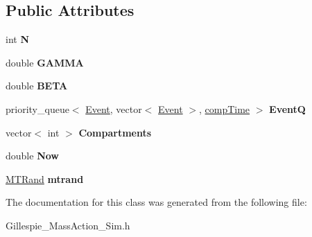 \subsection*{Public Attributes}
\begin{DoxyCompactItemize}
\item 
\hypertarget{classGillespie__MassAction__Sim_adccdc2bfebe0292d126e45dfc6483714}{}int {\bfseries N}\label{classGillespie__MassAction__Sim_adccdc2bfebe0292d126e45dfc6483714}

\item 
\hypertarget{classGillespie__MassAction__Sim_a559d55e39e19391925dca421def8671e}{}double {\bfseries G\+A\+M\+M\+A}\label{classGillespie__MassAction__Sim_a559d55e39e19391925dca421def8671e}

\item 
\hypertarget{classGillespie__MassAction__Sim_a3b757a10891e669bc4eedb85464d6198}{}double {\bfseries B\+E\+T\+A}\label{classGillespie__MassAction__Sim_a3b757a10891e669bc4eedb85464d6198}

\item 
\hypertarget{classGillespie__MassAction__Sim_abf5bebde787931664d87e0068ff58416}{}priority\+\_\+queue$<$ \hyperlink{classEvent}{Event}, vector$<$ \hyperlink{classEvent}{Event} $>$, \hyperlink{classcompTime}{comp\+Time} $>$ {\bfseries Event\+Q}\label{classGillespie__MassAction__Sim_abf5bebde787931664d87e0068ff58416}

\item 
\hypertarget{classGillespie__MassAction__Sim_ab87320968791e1161a69c11a165d677d}{}vector$<$ int $>$ {\bfseries Compartments}\label{classGillespie__MassAction__Sim_ab87320968791e1161a69c11a165d677d}

\item 
\hypertarget{classGillespie__MassAction__Sim_aa47aeaba7d1f7809f4e67d8e4cbf76cb}{}double {\bfseries Now}\label{classGillespie__MassAction__Sim_aa47aeaba7d1f7809f4e67d8e4cbf76cb}

\item 
\hypertarget{classGillespie__MassAction__Sim_aee206f3e71c6b045e7ae80f0a1a4c57c}{}\hyperlink{classMTRand}{M\+T\+Rand} {\bfseries mtrand}\label{classGillespie__MassAction__Sim_aee206f3e71c6b045e7ae80f0a1a4c57c}

\end{DoxyCompactItemize}


The documentation for this class was generated from the following file\+:\begin{DoxyCompactItemize}
\item 
Gillespie\+\_\+\+Mass\+Action\+\_\+\+Sim.\+h\end{DoxyCompactItemize}
